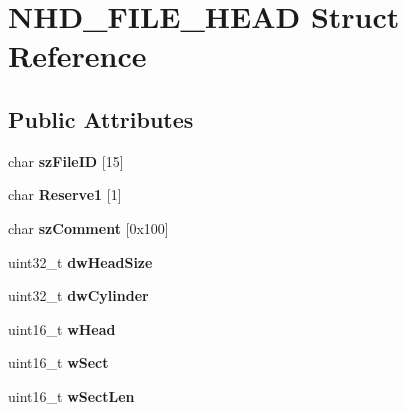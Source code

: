 \hypertarget{structNHD__FILE__HEAD}{\section{N\-H\-D\-\_\-\-F\-I\-L\-E\-\_\-\-H\-E\-A\-D Struct Reference}
\label{structNHD__FILE__HEAD}
}
\subsection*{Public Attributes}
\begin{DoxyCompactItemize}
\item 
\hypertarget{structNHD__FILE__HEAD_a11b52198fbd50d979e45f02dc2d73001}{char {\bfseries sz\-File\-I\-D} \mbox{[}15\mbox{]}}\label{structNHD__FILE__HEAD_a11b52198fbd50d979e45f02dc2d73001}

\item 
\hypertarget{structNHD__FILE__HEAD_ae040018591c9e565dcd15fbb5e500935}{char {\bfseries Reserve1} \mbox{[}1\mbox{]}}\label{structNHD__FILE__HEAD_ae040018591c9e565dcd15fbb5e500935}

\item 
\hypertarget{structNHD__FILE__HEAD_ad2b1018c617795160d20c4795883fb1f}{char {\bfseries sz\-Comment} \mbox{[}0x100\mbox{]}}\label{structNHD__FILE__HEAD_ad2b1018c617795160d20c4795883fb1f}

\item 
\hypertarget{structNHD__FILE__HEAD_a07015cb4f74620e92a1e5386c784ee6c}{uint32\-\_\-t {\bfseries dw\-Head\-Size}}\label{structNHD__FILE__HEAD_a07015cb4f74620e92a1e5386c784ee6c}

\item 
\hypertarget{structNHD__FILE__HEAD_adf0ce27d6fcb6fbb2486bac9cb60efd2}{uint32\-\_\-t {\bfseries dw\-Cylinder}}\label{structNHD__FILE__HEAD_adf0ce27d6fcb6fbb2486bac9cb60efd2}

\item 
\hypertarget{structNHD__FILE__HEAD_ae27c7576c01baabfc25f8a8b4510ffaf}{uint16\-\_\-t {\bfseries w\-Head}}\label{structNHD__FILE__HEAD_ae27c7576c01baabfc25f8a8b4510ffaf}

\item 
\hypertarget{structNHD__FILE__HEAD_ab9260449a29edf25468f55c0fb850d54}{uint16\-\_\-t {\bfseries w\-Sect}}\label{structNHD__FILE__HEAD_ab9260449a29edf25468f55c0fb850d54}

\item 
\hypertarget{structNHD__FILE__HEAD_aa5fb14b5198284f3f0f472d8b4bea4ef}{uint16\-\_\-t {\bfseries w\-Sect\-Len}}\label{structNHD__FILE__HEAD_aa5fb14b5198284f3f0f472d8b4bea4ef}


\end{DoxyCompactItemize}
